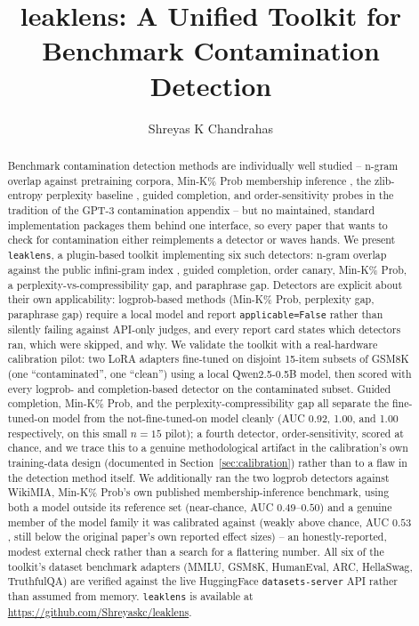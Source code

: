 \documentclass[11pt]{article}
\title{leaklens: A Unified Toolkit for Benchmark Contamination Detection}
\author{Shreyas K Chandrahas}
\date{}
\begin{document}
\maketitle

\begin{abstract}
Benchmark contamination detection methods are individually well studied --
n-gram overlap against pretraining corpora, Min-K\% Prob membership
inference \citep{shi2023detecting}, the zlib-entropy perplexity baseline
\citep{carlini2021extracting}, guided completion, and order-sensitivity
probes in the tradition of the GPT-3 contamination appendix
\citep{brown2020language} -- but no maintained, standard implementation
packages them behind one interface, so every paper that wants to check for
contamination either reimplements a detector or waves hands. We present
\texttt{leaklens}, a plugin-based toolkit implementing six such detectors:
n-gram overlap against the public infini-gram index
\citep{liu2024infinigram}, guided completion, order canary, Min-K\% Prob,
a perplexity-vs-compressibility gap, and paraphrase gap. Detectors are
explicit about their own applicability: logprob-based methods (Min-K\%
Prob, perplexity gap, paraphrase gap) require a local model and report
\texttt{applicable=False} rather than silently failing against API-only
judges, and every report card states which detectors ran, which were
skipped, and why. We validate the toolkit with a real-hardware calibration
pilot: two LoRA adapters fine-tuned on disjoint 15-item subsets of GSM8K
(one ``contaminated'', one ``clean'') using a local Qwen2.5-0.5B model,
then scored with every logprob- and completion-based detector on the
contaminated subset. Guided completion, Min-K\% Prob, and the
perplexity-compressibility gap all separate the fine-tuned-on model from
the not-fine-tuned-on model cleanly (AUC 0.92, 1.00, and 1.00
respectively, on this small $n=15$ pilot); a fourth detector,
order-sensitivity, scored at chance, and we trace this to a genuine
methodological artifact in the calibration's own training-data design
(documented in Section~\ref{sec:calibration}) rather than to a flaw in the
detection method itself. We additionally ran the two logprob detectors
against WikiMIA, Min-K\% Prob's own published membership-inference
benchmark, using both a model outside its reference set (near-chance,
AUC $0.49$--$0.50$) and a genuine member of the model family it was
calibrated against (weakly above chance, AUC $0.53$, still below the
original paper's own reported effect sizes) -- an honestly-reported,
modest external check rather than a search for a flattering number. All
six of the toolkit's dataset benchmark
adapters (MMLU, GSM8K, HumanEval, ARC, HellaSwag, TruthfulQA) are verified
against the live HuggingFace \texttt{datasets-server} API rather than
assumed from memory. \texttt{leaklens} is available at
\url{https://github.com/Shreyaskc/leaklens}.
\end{abstract}
\end{document}
